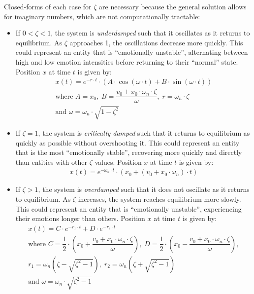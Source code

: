 Closed-forms of each case for $\zeta$ are necessary because the general
solution allows for imaginary numbers, which are not computationally tractable:
\begin{itemize}
    \item If $0 < \zeta < 1$, the system is \textit{underdamped} such that it
    oscillates as it returns to equilibrium. As $\zeta$ approaches 1, the
    oscillations decrease more quickly. This could represent an entity that is
    ``emotionally unstable'', alternating between high and low emotion
    intensities before returning to their ``normal'' state. Position $x$ at
    time $t$ is given by:
    $$\begin{gathered}
        x(t) = e^{-r \cdot t} \cdot \left( A \cdot \cos(\omega \cdot t) + B
        \cdot \sin(\omega \cdot t) \right) \\
        \text{where } A = x_0, \; B = \dfrac{v_0 + x_0 \cdot \omega_n \cdot
            \zeta}{\omega}, \; r = \omega_n \cdot \zeta \\
        \text{and } \omega = \omega_n \cdot \sqrt{1 - \zeta^2}
    \end{gathered}$$

    \item If $\zeta = 1$, the system is \textit{critically damped} such that
    it returns to equilibrium as quickly as possible without overshooting it.
    This could represent an entity that is the most ``emotionally stable'',
    recovering more quickly and directly than entities with other $\zeta$
    values. Position $x$ at time $t$ is given by:
    $$\begin{gathered}
        x(t) = e^{-\omega_n \cdot t} \cdot \left(x_0 + \left(v_0 + x_0
        \cdot \omega_n\right) \cdot t \right)
    \end{gathered}$$

    \item If $\zeta > 1$, the system is \textit{overdamped} such that it does
    not oscillate as it returns to equilibrium. As $\zeta$ increases, the
    system reaches equilibrium more slowly. This could represent an entity that
    is ``emotionally unstable'', experiencing their emotions longer than
    others. Position $x$ at time $t$ is given by:
    $$\begin{gathered}
        x(t) = C \cdot e^{-r_1 \cdot t} + D \cdot e^{-r_2 \cdot t} \\
        \text{where } C = \dfrac{1}{2} \cdot \left( x_0 + \dfrac{v_0 + x_0
            \cdot \omega_n \cdot \zeta}{\omega}\right), \; D = \dfrac{1}{2}
        \cdot \left( x_0 - \dfrac{v_0 + x_0 \cdot \omega_n \cdot
            \zeta}{\omega}\right), \\
        r_1 = \omega_n(\zeta - \sqrt{\zeta^2 - 1}), \; r_2 = \omega_n(\zeta
        + \sqrt{\zeta^2 - 1}) \\
        \text{and } \omega = \omega_n \cdot \sqrt{\zeta^2 - 1}
    \end{gathered}$$
\end{itemize}

